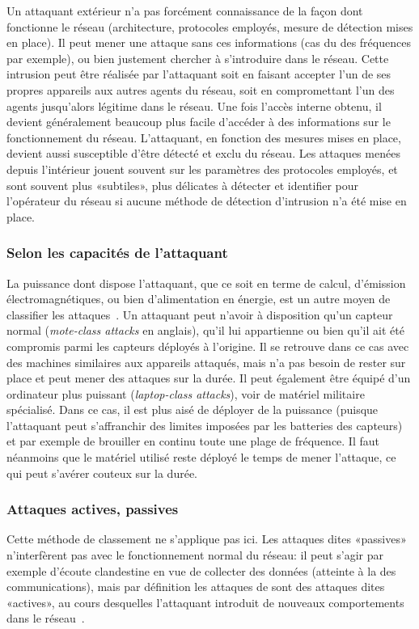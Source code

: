 Un attaquant extérieur n'a pas forcément connaissance de la façon dont fonctionne le réseau (architecture, protocoles employés, mesure de détection mises en place).
Il peut mener une attaque sans ces informations (cas du  des fréquences par exemple), ou bien justement chercher à s'introduire dans le réseau.
Cette intrusion peut être réalisée par l'attaquant soit en faisant accepter l'un de ses propres appareils aux autres agents du réseau, soit en compromettant l'un des agents jusqu'alors légitime dans le réseau.
Une fois l'accès interne obtenu, il devient généralement beaucoup plus facile d'accéder à des informations sur le fonctionnement du réseau.
L'attaquant, en fonction des mesures mises en place, devient aussi susceptible d'être détecté et exclu du réseau.
Les attaques menées depuis l'intérieur jouent souvent sur les paramètres des protocoles employés, et sont souvent plus «subtiles», plus délicates à détecter et identifier pour l'opérateur du réseau si aucune méthode de détection d'intrusion n'a été mise en place.

    \subsubsection{Selon les capacités de l'attaquant}
La puissance dont dispose l'attaquant, que ce soit en terme de calcul, d'émission électromagnétiques, ou bien d'alimentation en énergie, est un autre moyen de classifier les attaques~\cite{AD14}.
Un attaquant peut n'avoir à disposition qu'un capteur normal (\textit{mote-class attacks} en anglais), qu'il lui appartienne ou bien qu'il ait été compromis parmi les capteurs déployés à l'origine.
Il se retrouve dans ce cas avec des machines similaires aux appareils attaqués, mais n'a pas besoin de rester sur place et peut mener des attaques sur la durée.
Il peut également être équipé d'un ordinateur plus puissant (\textit{laptop-class attacks}), voir de matériel militaire spécialisé.
Dans ce cas, il est plus aisé de déployer de la puissance (puisque l'attaquant peut s'affranchir des limites imposées par les batteries des capteurs) et par exemple de brouiller en continu toute une plage de fréquence.
Il faut néanmoins que le matériel utilisé reste déployé le temps de mener l'attaque, ce qui peut s'avérer couteux sur la durée.

    \subsubsection{Attaques actives, passives}
Cette méthode de classement ne s'applique pas ici.
Les attaques dites «passives» n'interfèrent pas avec le fonctionnement normal du réseau: il peut s'agir par exemple d'écoute clandestine en vue de collecter des données (atteinte à la  des communications), mais par définition les attaques de \dds sont des attaques dites «actives», au cours desquelles l'attaquant introduit de nouveaux comportements dans le réseau~\cite{SZFDXC14}.

